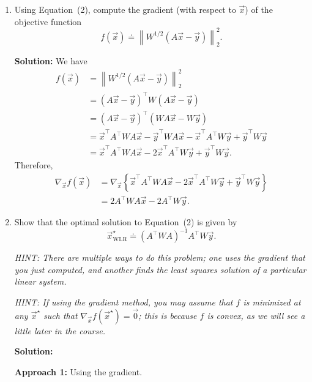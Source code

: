 \documentclass[10pt]{article}
\begin{document}
\begin{enumerate}[label=(\alph*)]
    \item Using Equation~(2), compute the gradient (with respect to $\vec{x}$) of the objective function
    \begin{equation}
        f(\vec{x}) \doteq \left\| W^{1/2}(A\vec{x} - \vec{y}) \right\|_2^2.
    \end{equation}

    \textbf{Solution:} We have
    \begin{align}
        f(\vec{x}) &= \left\| W^{1/2}(A\vec{x} - \vec{y}) \right\|_2^2 \\
        &= (A\vec{x} - \vec{y})^\top W (A\vec{x} - \vec{y}) \\
        &= (A\vec{x} - \vec{y})^\top (WA\vec{x} - W\vec{y}) \\
        &= \vec{x}^\top A^\top W A \vec{x} - \vec{y}^\top W A \vec{x} - \vec{x}^\top A^\top W \vec{y} + \vec{y}^\top W \vec{y} \\
        &= \vec{x}^\top A^\top W A \vec{x} - 2\vec{x}^\top A^\top W \vec{y} + \vec{y}^\top W \vec{y}.
    \end{align}
    Therefore,
    \begin{align}
        \nabla_{\vec{x}} f(\vec{x}) &= \nabla_{\vec{x}} \left\{ \vec{x}^\top A^\top W A \vec{x} - 2\vec{x}^\top A^\top W \vec{y} + \vec{y}^\top W \vec{y} \right\} \\
        &= 2A^\top W A \vec{x} - 2A^\top W \vec{y}.
    \end{align}

    \item Show that the optimal solution to Equation~(2) is given by
    \begin{equation}
        \vec{x}^\star_{\mathrm{WLR}} \doteq (A^\top W A)^{-1} A^\top W \vec{y}.
    \end{equation}

    \emph{HINT: There are multiple ways to do this problem; one uses the gradient that you just computed, and another finds the least squares solution of a particular linear system.}

    \emph{HINT: If using the gradient method, you may assume that $f$ is minimized at any $\vec{x}^\star$ such that $\nabla_{\vec{x}} f(\vec{x}^\star) = \vec{0}$; this is because $f$ is convex, as we will see a little later in the course.}

    \textbf{Solution:}

    \textbf{Approach 1:} Using the gradient.


\end{enumerate}
\end{document}
